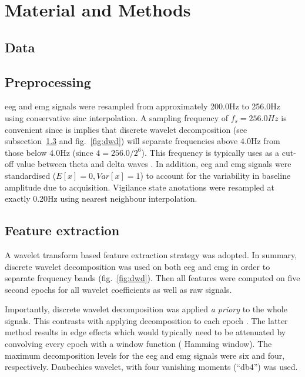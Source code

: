 \section{Material and Methods} \label{matmet}

\subsection{Data}

\subsection{Preprocessing}

\gls{eeg} and \gls{emg} signals were resampled from approximately 200.0Hz to 256.0Hz using
conservative sinc interpolation.
A sampling frequency of $f_s  = 256.0Hz$ is convenient since is implies that discrete wavelet decomposition (see subsection~\ref{sub:features} and fig.~\ref{fig:dwd}) will separate
frequencies above 4.0Hz from those below 4.0Hz (since $4 = 256.0/{2^6} $).
This frequency is typically uses as a cut-off value between theta and delta waves \citationneeded{}.
In addition, \gls{eeg} and \gls{emg} signals were standardised ($E[x] = 0, Var[x] = 1$) to account for the variability in baseline amplitude due to acquisition.
Vigilance state anotations were resampled at exactly 0.20Hz using nearest neighbour interpolation.

\subsection{Feature extraction}
\label{sub:features}

A wavelet transform based feature extraction strategy was adopted.
In summary, discrete wavelet decomposition was used on both \gls{eeg} and \gls{emg}
in order to separate frequency bands (fig.~\ref{fig:dwd}).
Then all features were computed on five second epochs for all wavelet coefficients as well as raw signals.



Importantly, discrete wavelet decomposition was applied \emph{a priory} to the whole signals.
This contrasts with applying decomposition to each epoch \citationneeded{}.
The latter method results in edge effects which would typically need to be attenuated by convolving every epoch with a window function (\eg{} Hamming window).
The maximum decomposition levels for the \gls{eeg} and \gls{emg} signals were six and four, respectively.
Daubechies wavelet, with four vanishing moments (``db4'') was used.

